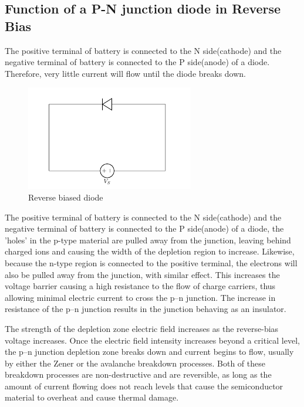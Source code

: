 		\subsection{Function of a P-N junction diode in Reverse Bias}
			The positive terminal of battery is connected to the N side(cathode) and the negative terminal of battery is connected to the P side(anode) of a diode. Therefore, very little current will flow until the diode breaks down.
			\begin{figure}[h]
				\centering
				\includegraphics[width=0.3\linewidth]{img/exp5/4}
				\caption{Reverse biased diode}
				\label{fig:pnjr}
			\end{figure}
			The positive terminal of battery is connected to the N side(cathode) and the negative terminal of battery is connected to the P side(anode) of a diode, the 'holes' in the p-type material are pulled away from the junction, leaving behind charged ions and causing the width of the depletion region to increase. Likewise, because the n-type region is connected to the positive terminal, the electrons will also be pulled away from the junction, with similar effect. This increases the voltage barrier causing a high resistance to the flow of charge carriers, thus allowing minimal electric current to cross the p–n junction. The increase in resistance of the p–n junction results in the junction behaving as an insulator.
			
			The strength of the depletion zone electric field increases as the reverse-bias voltage increases. Once the electric field intensity increases beyond a critical level, the p–n junction depletion zone breaks down and current begins to flow, usually by either the Zener or the avalanche breakdown processes. Both of these breakdown processes are non-destructive and are reversible, as long as the amount of current flowing does not reach levels that cause the semiconductor material to overheat and cause thermal damage.
		
